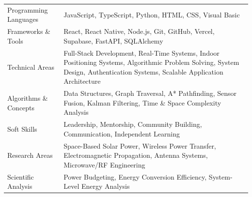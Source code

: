 \documentclass[a4paper,12pt]{article}
\begin{document}
\begin{tabularx}{\linewidth}{@{}l X@{}}

Programming Languages & JavaScript, TypeScript, Python, HTML, CSS, Visual Basic \\

Frameworks \& Tools & React, React Native, Node.js, Git, GitHub, Vercel, Supabase, FastAPI, SQLAlchemy \\

Technical Areas & Full-Stack Development, Real-Time Systems, Indoor Positioning Systems, Algorithmic Problem Solving, System Design, Authentication Systems, Scalable Application Architecture \\

Algorithms \& Concepts & Data Structures, Graph Traversal, A* Pathfinding, Sensor Fusion, Kalman Filtering, Time \& Space Complexity Analysis \\

Soft Skills & Leadership, Mentorship, Community Building, Communication, Independent Learning \\

Research Areas & Space-Based Solar Power, Wireless Power
Transfer, Electromagnetic Propagation, Antenna Systems,
Microwave/RF Engineering \\

Scientific Analysis & Power Budgeting, Energy Conversion
Efficiency, System-Level Energy Analysis \\

\end{tabularx}

\vfill

\end{document}

